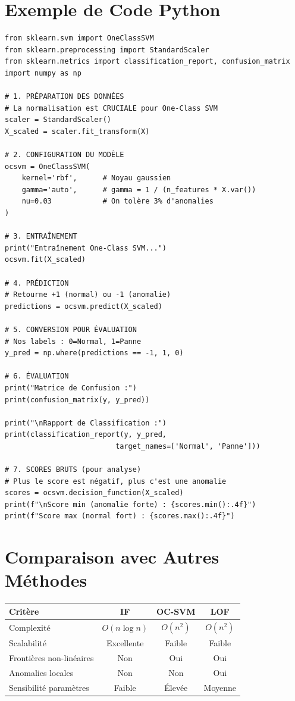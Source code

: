 \documentclass[a4paper,11pt]{article}
\begin{document}
\section{Exemple de Code Python}

\begin{codebox}
\begin{lstlisting}
from sklearn.svm import OneClassSVM
from sklearn.preprocessing import StandardScaler
from sklearn.metrics import classification_report, confusion_matrix
import numpy as np

# 1. PRÉPARATION DES DONNÉES
# La normalisation est CRUCIALE pour One-Class SVM
scaler = StandardScaler()
X_scaled = scaler.fit_transform(X)

# 2. CONFIGURATION DU MODÈLE
ocsvm = OneClassSVM(
    kernel='rbf',      # Noyau gaussien
    gamma='auto',      # gamma = 1 / (n_features * X.var())
    nu=0.03            # On tolère 3% d'anomalies
)

# 3. ENTRAÎNEMENT
print("Entraînement One-Class SVM...")
ocsvm.fit(X_scaled)

# 4. PRÉDICTION
# Retourne +1 (normal) ou -1 (anomalie)
predictions = ocsvm.predict(X_scaled)

# 5. CONVERSION POUR ÉVALUATION
# Nos labels : 0=Normal, 1=Panne
y_pred = np.where(predictions == -1, 1, 0)

# 6. ÉVALUATION
print("Matrice de Confusion :")
print(confusion_matrix(y, y_pred))

print("\nRapport de Classification :")
print(classification_report(y, y_pred, 
                          target_names=['Normal', 'Panne']))

# 7. SCORES BRUTS (pour analyse)
# Plus le score est négatif, plus c'est une anomalie
scores = ocsvm.decision_function(X_scaled)
print(f"\nScore min (anomalie forte) : {scores.min():.4f}")
print(f"Score max (normal fort) : {scores.max():.4f}")
\end{lstlisting}
\end{codebox}

\section{Comparaison avec Autres Méthodes}

\begin{center}
\begin{tabular}{|l|c|c|c|}
\hline
\textbf{Critère} & \textbf{IF} & \textbf{OC-SVM} & \textbf{LOF} \\
\hline
Complexité & $O(n \log n)$ & $O(n^2)$ & $O(n^2)$ \\
Scalabilité & Excellente & Faible & Faible \\
Frontières non-linéaires & Non & Oui & Oui \\
Anomalies locales & Non & Non & Oui \\
Sensibilité paramètres & Faible & Élevée & Moyenne \\
\hline
\end{tabular}
\end{center}
\end{document}
